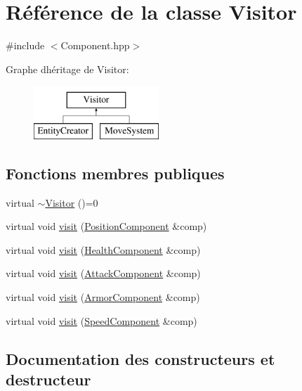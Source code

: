 \hypertarget{classVisitor}{}\section{Référence de la classe Visitor}
\label{classVisitor}


{\ttfamily \#include $<$Component.\+hpp$>$}

Graphe d\textquotesingle{}héritage de Visitor\+:\begin{figure}[H]
\begin{center}
\leavevmode
\includegraphics[height=2.000000cm]{classVisitor}
\end{center}
\end{figure}
\subsection*{Fonctions membres publiques}
\begin{DoxyCompactItemize}
\item 
virtual \hyperlink{classVisitor_a02ffa1442ae77b4dbc1dc362be511dc5}{$\sim$\+Visitor} ()=0
\item 
virtual void \hyperlink{classVisitor_afc865e84cb1293284e6f524a00049b11}{visit} (\hyperlink{structPositionComponent}{Position\+Component} \&comp)
\item 
virtual void \hyperlink{classVisitor_aba8f1cab6bd85c2b86ed0b8103d30f45}{visit} (\hyperlink{structHealthComponent}{Health\+Component} \&comp)
\item 
virtual void \hyperlink{classVisitor_a6bcc6c971d8ba324024e3cf8e06e3751}{visit} (\hyperlink{structAttackComponent}{Attack\+Component} \&comp)
\item 
virtual void \hyperlink{classVisitor_a05ce14929a5c30d182b46f8843605468}{visit} (\hyperlink{structArmorComponent}{Armor\+Component} \&comp)
\item 
virtual void \hyperlink{classVisitor_a42ce8ce5e7c789dc4b919a088e68829b}{visit} (\hyperlink{structSpeedComponent}{Speed\+Component} \&comp)
\end{DoxyCompactItemize}


\subsection{Documentation des constructeurs et destructeur}
\mbox{\label{classVisitor_a02ffa1442ae77b4dbc1dc362be511dc5}} 
